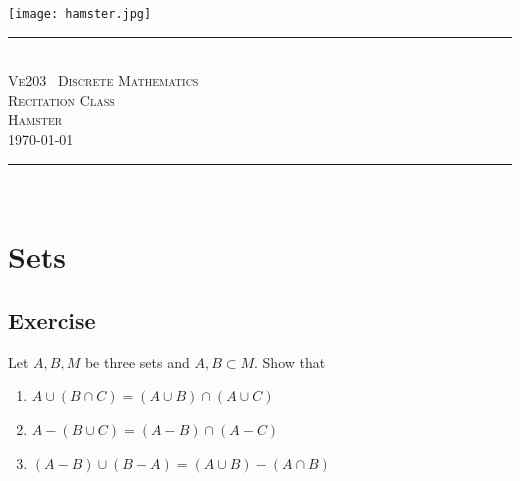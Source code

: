 \documentclass[12pt]{article}
\begin{document}
\begin{center}
    \texttt{[image: hamster.jpg]}  \\
    \rule{\linewidth}{0.2 mm} \\[0.4 cm]
    \textsc{\LARGE  Ve203 \ Discrete Mathematics}\\[0.3 cm]
    \textsc{\LARGE  Recitation Class}\\[0.7 cm]		
    \textsc{\large Hamster\\ \today}
    \rule{\linewidth}{0.2 mm} \\[0.5 cm]
\end{center}
    \begin{minipage}{\textwidth}
        \tableofcontents
    \end{minipage}
\newpage
\section{Sets}
\subsection{Exercise}
\par Let $A,B,M$ be three sets and $A,B \subset M$. Show that 
\begin{enumerate}
	\item $A \cup(B \cap C)=(A \cup B) \cap(A \cup C)$
	\item $A-(B \cup C)=(A-B) \cap(A-C)$
	\item $(A - B) \cup (B - A) = (A \cup B) - (A \cap B)$
\end{enumerate}
\end{document}
